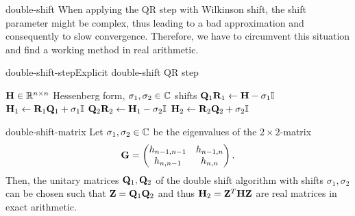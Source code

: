\begin{intro}{double-shift}
  When applying the QR step with Wilkinson shift, the shift parameter
  might be complex, thus leading to a bad approximation and
  consequently to slow convergence. Therefore, we have to circumvent
  this situation and find a working method in real arithmetic. 
\end{intro}

\begin{Algorithm*}{double-shift-step}{Explicit double-shift QR step}
  \begin{algorithmic}[1]
    \Require $\mathbf H\in\mathbb R^{n\times n}$ Hessenberg form, $\sigma_1,\sigma_2\in\mathbb C$ shifts
    \State $\mathbf Q_1\mathbf R_1 \gets \mathbf H - \sigma_1\mathbb I$ 
    \State $\mathbf H_1 \gets \mathbf R_1\mathbf Q_1 + \sigma_1\mathbb I$
    \State $\mathbf Q_2\mathbf R_2 \gets \mathbf H_1 - \sigma_2\mathbb I$ 
    \State $\mathbf H_2 \gets \mathbf R_2\mathbf Q_2 + \sigma_2\mathbb I$
  \end{algorithmic}
\end{Algorithm*}

\begin{Lemma}{double-shift-matrix}
  Let $\sigma_1,\sigma_2\in\mathbb C$ be the eigenvalues of the $2\times2$-matrix
  \begin{gather}
    \mathbf G =
    \begin{pmatrix}
      h_{n-1,n-1}&h_{n-1,n}\\h_{n,n-1}&h_{n,n}
    \end{pmatrix}.
  \end{gather}
  Then, the unitary matrices $\mathbf Q_1,\mathbf Q_2$ of the double shift
  algorithm with shifts $\sigma_1,\sigma_2$ can be chosen such that
  $\mathbf Z = \mathbf Q_1\mathbf Q_2$ and thus $\mathbf H_2 = \mathbf Z^T\mathbf H\mathbf Z$ are
  real matrices in exact arithmetic.
\end{Lemma}

